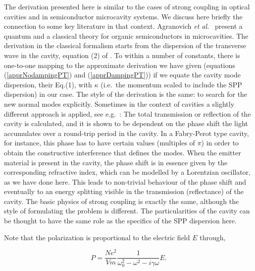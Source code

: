 \documentclass[12pt]{iopart}
\begin{document}
The derivation presented here is similar to the cases of strong coupling in optical cavities and in semiconductor microcavity systems. We discuss here briefly the connection to some key literature in that context. Agranovich {\it et al.}\ \cite{Agranovich2003} present a quantum and a classical theory for organic semiconductors in microcavities. The derivation in the classical formalism starts from the dispersion of the transverse wave in the cavity, equation (2) of \cite{Agranovich2003}. To within a number of constants, there is one-to-one mapping to the approximate derivation we have given (equations (\ref{apprNodampingPT}) and (\ref{apprDampingPT}))  if we equate the cavity mode dispersion, their Eq.(1), with $\kappa$ (i.e.\ the momentum scaled to include the SPP dispersion) in our case. The style of the derivation is the same: to search for the new normal modes explicitly. Sometimes in the context of cavities a slightly different approach is applied, see e.g.\ \cite{Zhu1990}: The total transmission or reflection of the cavity is calculated, and it is shown to be dependent on the phase shift the light accumulates over a round-trip period in the cavity. In a Fabry-Perot type cavity, for instance, this phase has to have certain values (multiples of $\pi$) in order to obtain the constructive interference that defines the modes. When the emitter material is present in the cavity, the phase shift is in essence given by the corresponding refractive index, which can be modelled by a Lorentzian oscillator, as we have done here. This leads to non-trivial behaviour of the phase shift and eventually to an energy splitting visible in the transmission (reflectance) of the cavity. The basic physics of strong coupling is exactly the same, although the style of formulating the problem is different. The particularities of the cavity can be thought to have the same role as the specifics of the SPP dispersion here. 

Note that the polarization is proportional to the electric field $E$ through,

\begin{equation}
P = \frac{Ne^2}{V m} \frac{1}{\omega_0^2 - \omega^2 - i \gamma \omega}E.
\end{equation}
\end{document}
